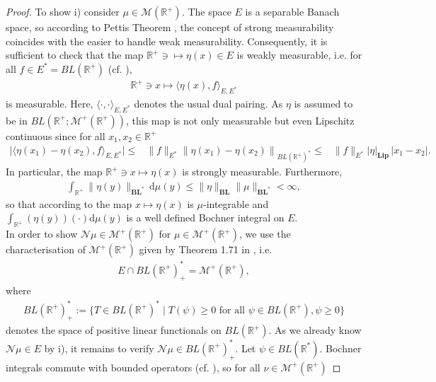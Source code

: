 \documentclass[12pt,a4paper]{amsart}
\newcommand{\ud}{\mathrm{d}}
\newcommand{\BLN}{\mathbf{BL}}
\newcommand{\Lip}{\mathbf{Lip}} 				%
\newcommand{\R}{\mathbb{R}}
\begin{document}
\begin{proof}
To show i) consider $\mu\in \mathcal{M}(\R^+)$. The space $E$ is a separable Banach space, so  according to Pettis Theorem \cite[Theorem, Section V, \S 4]{Yosida},  the concept of strong measurability coincides with the easier to handle weak measurability. Consequently, it is sufficient to check that the map $   \mathbb{R}^+\ni \mapsto\eta(x)\in E$ is weakly measurable, i.e. for all $f\in E^*=BL(\R^+)$ (cf. \cite[Thm 1.41]{Duell_book}), 
    \begin{align*}
    \R^+\ni x\mapsto \langle \eta(x),f\rangle_{E,E^*}
    \end{align*}
is measurable. Here, $\langle\cdot,\cdot\rangle_{E,E^*}$ denotes the usual dual pairing. As $\eta$ is assumed to be in $BL(\R^+; \mathcal M^+(\R^+))$, this map is not only measurable but even Lipschitz continuous since for all $x_1, x_2 \in \R^+$
	\begin{align*}
		\big|\big\langle \eta(x_1) - \eta(x_2),f\big\rangle_{E,E^*}\big| \leq& \|f\|_{E^*}  \left\|\eta(x_1)- \eta(x_2)\right\|_{BL(\R^+)^*}
		 \leq&  \|f\|_{E^*}  |\eta|_{\Lip}\, |x_1-x_2|. 
	\end{align*}
In particular, the map $\R^+\ni x\mapsto \eta(x)$ is strongly measurable. Furthermore, 
    \begin{align*}
    \int_{\R^+}\|\eta(y)\|_{\BLN^*}\, \ud \mu(y)\leq \|\eta\|_{\BLN}\|\mu\|_{\BLN^*}<\infty,
    \end{align*}
so that according to \cite[Theorem 1, Section V \S 5]{Yosida} the map $x \mapsto \eta(x)$ is $\mu$-integrable and $\int_{\R^+} (\eta (y))(\cdot)  \ud \mu(y)$ is a well defined Bochner integral on $E$.\\
In order to show $\mathcal{N}\mu\in \mathcal{M}^+(\R^+)$ for $\mu\in \mathcal{M}^+(\R^+)$, we use the characterisation of $\mathcal{M}^+(\R^+)$ given by Theorem 1.71 in \cite{Duell_book}, i.e.
    \begin{align*}
    E\cap BL(\R^+)^*_+=\mathcal{M}^+(\R^+),
    \end{align*}
where 
    \begin{align*}
        BL(\R^+)^*_+:=\{T\in BL(\R^+)^*\mid T(\psi)\geq 0 \text{ for all } \psi\in BL(\R^+), \psi\geq 0\}
    \end{align*}
denotes the space of positive linear functionals on $BL(\R^+)$. As we already know $\mathcal{N}\mu\in E$ by i), it remains to verify  $\mathcal{N}\mu\in BL(\R^+)^*_+$. Let $\psi\in BL(\R^*)$. Bochner integrals commute with bounded operators (cf. \cite[Corollary 2, Section V §5]{Yosida}),  so for all $\nu\in \mathcal{M}^+(\R^+)$

\end{proof}
\end{document}
